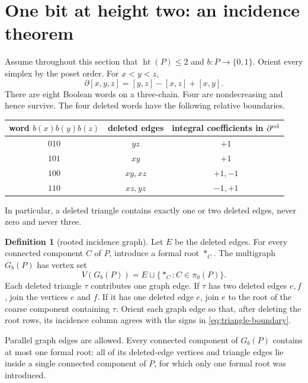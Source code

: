 \documentclass[11pt]{article}
\theoremstyle{definition}
\newtheorem{definition}[theorem]{Definition}
\theoremstyle{remark}
\DeclareMathOperator{\posht}{ht}
\begin{document}
\section{One bit at height two: an incidence theorem}\label{sec:incidence}

Assume throughout this section that $\posht(P)\le2$ and $b:P\to\{0,1\}$.
Orient every simplex by the poset order.  For $x<y<z$,
\begin{equation}\label{eq:triangle-boundary}
  \partial[x,y,z]=[y,z]-[x,z]+[x,y].
\end{equation}
There are eight Boolean words on a three-chain.  Four are nondecreasing and hence
survive.  The four deleted words have the following relative boundaries.

\begin{center}
\begin{tabular}{@{}ccc@{}}
\toprule
word $b(x)b(y)b(z)$ & deleted edges & integral coefficients in $\partial^{\rm rel}$ \\
\midrule
$010$ & $yz$ & $+1$ \\
$101$ & $xy$ & $+1$ \\
$100$ & $xy,xz$ & $+1,-1$ \\
$110$ & $xz,yz$ & $-1,+1$ \\
\bottomrule
\end{tabular}
\end{center}

In particular, a deleted triangle contains exactly one or two deleted edges, never
zero and never three.

\begin{definition}[rooted incidence graph]\label{def:rootedgraph}
Let $E$ be the deleted edges.  For every connected component $C$ of $P$, introduce a
formal root $*_C$.  The multigraph $G_b(P)$ has vertex set
\[
  V(G_b(P))=E\sqcup\{*_C:C\in\pi_0(P)\}.
\]
Each deleted triangle $\tau$ contributes one graph edge.  If $\tau$ has two deleted
edges $e,f$, join the vertices $e$ and $f$.  If it has one deleted edge $e$, join $e$
to the root of the coarse component containing $\tau$.  Orient each graph edge so that,
after deleting the root rows, its incidence column agrees with the signs in
\eqref{eq:triangle-boundary}.
\end{definition}

Parallel graph edges are allowed.  Every connected component of $G_b(P)$ contains at
most one formal root: all of its deleted-edge vertices and triangle edges lie inside a
single connected component of $P$, for which only one formal root was introduced.
\end{document}
